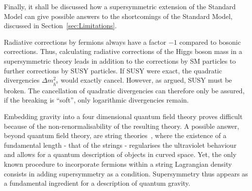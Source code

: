 Finally, it shall be discussed how a supersymmetric extension of the Standard Model can give possible answers to the shortcomings of the Standard Model, discussed in Section~\ref{sec:Limitations}.

Radiative corrections by fermions always have a factor $-1$ compared to bosonic corrections.
Thus, calculating radiative corrections of the Higgs boson mass in a supersymmetric theory leads in addition to the corrections by SM particles to further corrections by SUSY particles.
If SUSY were exact, the quadratic divergencies $\Delta m^2_{h^0}$ would exactly cancel. 
However, as argued, SUSY must be broken.
The cancellation of quadratic divergencies can therefore only be assured, if the breaking is ``soft'', \ie only logarithmic divergencies remain.

Embedding gravity into a four dimensional quantum field theory proves difficult because of the non-renormalisability of the resulting theory.
A possible answer, beyond quantum field theory, are string theories~\cite{bib:Strings_1974}, where the existence of a fundamental length - that of the strings - regularises the ultraviolet behaviour and allows for a quantum description of objects in curved space.
Yet, the only known procedure to incorporate fermions within a string Lagrangian density consists in adding supersymmetry as a condition. 
Supersymmetry thus appears as a fundamental ingredient for a description of quantum gravity. %



